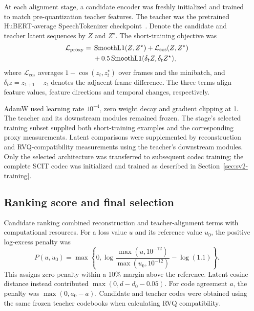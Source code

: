 At each alignment stage, a candidate encoder was freshly initialized and trained to match pre-quantization teacher features. The teacher was the pretrained HuBERT-average SpeechTokenizer checkpoint~\cite{speechtokenizer}. Denote the candidate and teacher latent sequences by $Z$ and $Z^\star$. The short-training objective was
\begin{equation}
\begin{split}
 \mathcal L_{\rm proxy}={}&
 \operatorname{SmoothL1}(Z,Z^\star)
 +\mathcal L_{\cos}(Z,Z^\star)\\
 &+0.5\operatorname{SmoothL1}
      (\delta_t Z,\delta_t Z^\star),
\end{split}
\label{eq:sv2-proxy}
\end{equation}
where $\mathcal L_{\cos}$ averages $1-\cos(z_t,z_t^\star)$ over frames and the minibatch, and $\delta_t z=z_{t+1}-z_t$ denotes the adjacent-frame difference. The three terms align feature values, feature directions and temporal changes, respectively.

AdamW used learning rate $10^{-4}$, zero weight decay and gradient clipping at 1. The teacher and its downstream modules remained frozen. The stage's selected training subset supplied both short-training examples and the corresponding proxy measurements. Latent comparisons were supplemented by reconstruction and RVQ-compatibility measurements using the teacher's downstream modules. Only the selected architecture was transferred to subsequent codec training; the complete SCIT codec was initialized and trained as described in Section~\ref{sec:sv2-training}.

\subsection{Ranking score and final selection}
Candidate ranking combined reconstruction and teacher-alignment terms with computational resources. For a loss value $u$ and its reference value $u_0$, the positive log-excess penalty was
\begin{equation}
 P(u,u_0)=\max\left\{0,
 \log\frac{\max(u,10^{-12})}{\max(u_0,10^{-12})}
 -\log(1.1)\right\}.
 \label{eq:sv2-penalty}
\end{equation}
This assigns zero penalty within a 10\% margin above the reference. Latent cosine distance instead contributed $\max(0,d-d_0-0.05)$. For code agreement $a$, the penalty was $\max(0,a_0-a)$. Candidate and teacher codes were obtained using the same frozen teacher codebooks when calculating RVQ compatibility.

